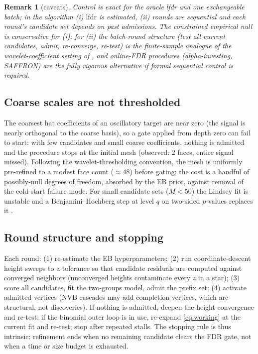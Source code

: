 \documentclass[11pt]{article}
\newtheorem{remark}[proposition]{Remark}
\newcommand{\lfdr}{\mathrm{lfdr}}
\begin{document}
\begin{remark}[caveats]
Control is exact for the oracle lfdr and one exchangeable batch; in the algorithm
(i) $\lfdr$ is estimated, (ii) rounds are sequential and each round's candidate set
depends on past admissions. The constrained empirical null is conservative for (i);
for (ii) the batch-round structure (test all current candidates, admit, re-converge,
re-test) is the finite-sample analogue of the wavelet-coefficient setting of
\cite{abramovich2006}, and online-FDR procedures (alpha-investing, SAFFRON) are the
fully rigorous alternative if formal sequential control is required.
\end{remark}

\subsection{Coarse scales are not thresholded}
The coarsest hat coefficients of an oscillatory target are near zero (the signal is
nearly orthogonal to the coarse basis), so a gate applied from depth zero can fail to
start: with few candidates and small coarse coefficients, nothing is admitted and the
procedure stops at the initial mesh (observed: 2 faces, entire signal missed).
Following the wavelet-thresholding convention, the mesh is uniformly pre-refined to a
modest face count ($\approx 48$) before gating; the cost is a handful of possibly-null
degrees of freedom, absorbed by the EB prior, against removal of the cold-start failure
mode. For small candidate sets ($M<50$) the Lindsey fit is unstable and a
Benjamini--Hochberg step at level $q$ on two-sided $p$-values replaces it
\cite{bh1995}.

\subsection{Round structure and stopping}
Each round: (1) re-estimate the EB hyperparameters; (2) run coordinate-descent height
sweeps to a tolerance so that candidate residuals are computed against converged
neighbors (unconverged heights contaminate every $z$ in a star); (3) score all
candidates, fit the two-groups model, admit the prefix set; (4) activate admitted
vertices (NVB cascades may add completion vertices, which are structural, not
discoveries). If nothing is admitted, deepen the height convergence and re-test; if the
binomial outer loop is in use, re-expand \eqref{eq:working} at the current fit and
re-test; stop after repeated stalls. The stopping rule is thus intrinsic: refinement
ends when no remaining candidate clears the FDR gate, not when a time or size budget is
exhausted.
\end{document}
